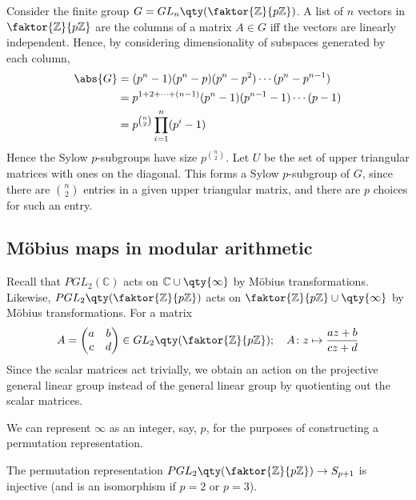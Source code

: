 \begin{example} \label{exm:5.1}
	Consider the finite group $G = GL_n\qty(\faktor{\mathbb Z}{p\mathbb Z})$.
	A list of $n$ vectors in $\faktor{\mathbb Z}{p\mathbb Z}$ are the columns of a matrix $A \in G$ iff the vectors are linearly independent.
	Hence, by considering dimensionality of subspaces generated by each column,
	\begin{align*}
		\abs{G} & = (p^n - 1)(p^n - p)(p^n - p^2) \cdots (p^n - p^{n-1})      \\
		        & = p^{1+2+\dots+(n-1)} (p^n - 1)(p^{n-1} - 1) \cdots (p - 1) \\
		        & = p^{\binom{n}{2}} \prod_{i=1}^n (p^i - 1)
	\end{align*}
	Hence the Sylow $p$-subgroups have size $p^{\binom{n}{2}}$.
	Let $U$ be the set of upper triangular matrices with ones on the diagonal.
	This forms a Sylow $p$-subgroup of $G$, since there are $\binom{n}{2}$ entries in a given upper triangular matrix, and there are $p$ choices for such an entry.
\end{example}

\subsection{M\"obius maps in modular arithmetic}
Recall that $PGL_2(\mathbb C)$ acts on $\mathbb C \cup \qty{\infty}$ by M\"obius transformations.
Likewise, $PGL_2\qty(\faktor{\mathbb Z}{p\mathbb Z})$ acts on $\faktor{\mathbb Z}{p\mathbb Z} \cup \qty{\infty}$ by M\"obius transformations.
For a matrix
\begin{align*}
	A = \begin{pmatrix}
		a & b \\
		c & d
	\end{pmatrix} \in GL_2\qty(\faktor{\mathbb Z}{p\mathbb Z});\quad A \colon z \mapsto \frac{az+b}{cz+d}
\end{align*}
Since the scalar matrices act trivially, we obtain an action on the projective general linear group instead of the general linear group by quotienting out the scalar matrices.

We can represent $\infty$ as an integer, say, $p$, for the purposes of constructing a permutation representation.

\begin{lemma} \label{lem:5.2}
	The permutation representation $PGL_2\qty(\faktor{\mathbb Z}{p\mathbb Z}) \to S_{p+1}$ is injective (and is an isomorphism if $p = 2$ or $p = 3$).
\end{lemma}

